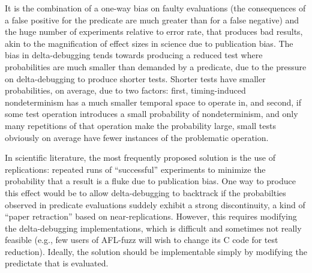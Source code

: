 It is the combination of
a one-way bias on faulty evaluations (the consequences of a false
positive for the predicate are much greater than for a false negative)
and the huge number of experiments relative to error rate, that
produces bad results, akin to the magnification of effect sizes
in science due to publication bias.  The bias in delta-debugging tends
towards producing a reduced test where probabilities are much smaller
than demanded by a predicate, due to the pressure on delta-debugging
to produce shorter tests.  Shorter tests have smaller probabilities,
on average, due to two factors:  first, timing-induced nondeterminism
has a much smaller temporal space to operate in, and second, if some
test operation introduces a small probability of nondeterminism, and
only many repetitions of that operation make the probability large,
small tests obviously on average have fewer instances of the
problematic operation.

In scientific literature, the most frequently proposed solution is the
use of replications:  repeated runs of ``successful'' experiments to
minimize the probability that a result is a fluke due to publication
bias.  One way to produce this effect would be to allow
delta-debugging to backtrack if the probabilties observed in predicate
evaluations suddely exhibit a strong discontinuity, a kind of ``paper
retraction'' based on near-replications.  However, this requires
modifying the delta-debugging implementations, which is difficult and
sometimes not really feasible (e.g., few users of AFL-fuzz \cite{aflfuzz} will wish
to change its C code for test reduction).  Ideally, the solution
should be implementable simply by modifying the predictate that is
evaluated.  

